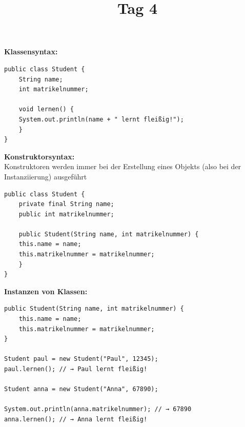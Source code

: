 \documentclass{../../sheet}
\title{\vkTitle\ Tag 4}
\begin{document}
\maketitle

\aufgabe{\vkEventDayFourTitle}
\vkEventDayFourText

\newpage
{}
\textbf{Klassensyntax:}
\begin{verbatim}
public class Student {
    String name;
    int matrikelnummer;

    void lernen() {
	System.out.println(name + " lernt fleißig!");
    }
}
\end{verbatim}

\textbf{Konstruktorsyntax:}\\
Konstruktoren werden immer bei der Erstellung eines Objekts (also bei der Instanziierung) ausgeführt
\begin{verbatim}
public class Student {
    private final String name;
    public int matrikelnummer;

    public Student(String name, int matrikelnummer) {
	this.name = name;
	this.matrikelnummer = matrikelnummer;
    }
}
	\end{verbatim}

\textbf{Instanzen von Klassen:}

\begin{verbatim}
public Student(String name, int matrikelnummer) {
    this.name = name;
    this.matrikelnummer = matrikelnummer;
}

Student paul = new Student("Paul", 12345);
paul.lernen(); // → Paul lernt fleißig!

Student anna = new Student("Anna", 67890);

System.out.println(anna.matrikelnummer); // → 67890
anna.lernen(); // → Anna lernt fleißig!

	\end{verbatim}



\newpage

\end{document}
